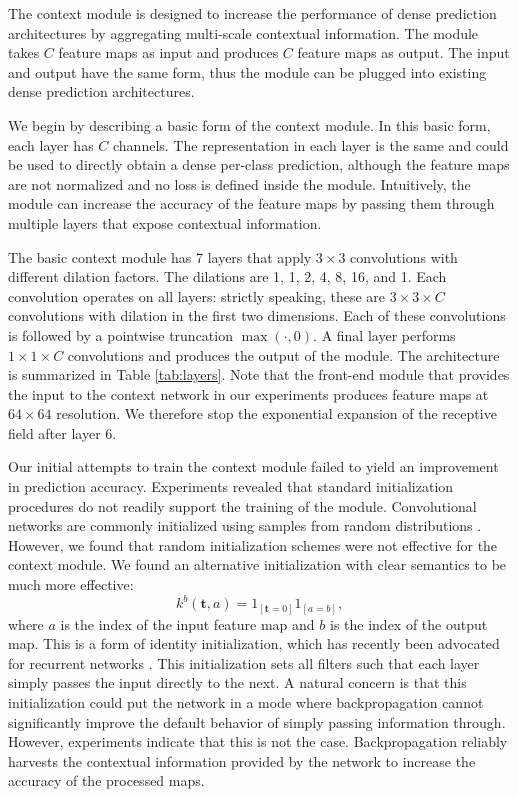 \documentclass{article} %
\def\tt{\mathbf t}
\newcommand{\timess}{\mathbin{\!\times\!}}
\begin{document}
The context module is designed to increase the performance of dense prediction architectures by aggregating multi-scale contextual information.
The module takes $C$ feature maps as input and produces $C$ feature maps as output. The input and output have the same form, thus the module can be plugged into existing dense prediction architectures.

We begin by describing a basic form of the context module. In this basic form, each layer has $C$ channels. The representation in each layer is the same and could be used to directly obtain a dense per-class prediction, although the feature maps are not normalized and no loss is defined inside the module. Intuitively, the module can increase the accuracy of the feature maps by passing them through multiple layers that expose contextual information.

The basic context module has 7 layers that apply $3\timess 3$ convolutions with different dilation factors. The dilations are 1, 1, 2, 4, 8, 16, and 1. Each convolution operates on all layers: strictly speaking, these are $3\timess 3\timess C$ convolutions with dilation in the first two dimensions. Each of these convolutions is followed by a pointwise truncation $\max(\cdot,0)$. A final layer performs $1\timess 1\timess C$ convolutions and produces the output of the module. The architecture is summarized in Table \ref{tab:layers}. Note that the front-end module that provides the input to the context network in our experiments produces feature maps at $64\timess 64$ resolution. We therefore stop the exponential expansion of the receptive field after layer 6.

Our initial attempts to train the context module failed to yield an improvement in prediction accuracy. Experiments revealed that standard initialization procedures do not readily support the training of the module. Convolutional networks are commonly initialized using samples from random distributions \citep{GlorotBengio2010,Krizhevsky2012,SimonyanZisserman2015}. However, we found that random initialization schemes were not effective for the context module.
We found an alternative initialization with clear semantics to be much more effective:
\begin{equation}
k^b (\tt, a) = 1_{[\tt = 0]}1_{[a=b]},
\end{equation}
where $a$ is the index of the input feature map and $b$ is the index of the output map. This is a form of identity initialization, which has recently been advocated for recurrent networks \citep{Le2015}. This initialization sets all filters such that each layer simply passes the input directly to the next. A natural concern is that this initialization could put the network in a mode where backpropagation cannot significantly improve the default behavior of simply passing information through. However, experiments indicate that this is not the case. Backpropagation reliably harvests the contextual information provided by the network to increase the accuracy of the processed maps.
\end{document}

